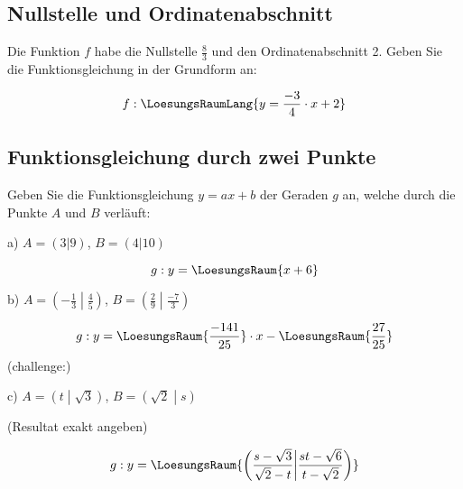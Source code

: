 \subsection{Nullstelle und Ordinatenabschnitt}
Die Funktion $f$ habe die Nullstelle $\frac83$ und den
Ordinatenabschnitt 2. Geben Sie die Funktionsgleichung in der
Grundform an:

\vspace{20mm}
$$f: \LoesungsRaumLang{y = \frac{-3}4 \cdot{} x + 2}$$

\subsection{Funktionsgleichung durch zwei Punkte}
Geben Sie die Funktionsgleichung $y=ax+b$ der Geraden $g$ an, welche
durch die Punkte $A$ und $B$ verläuft:

a) $A = (3|9)$, $B=(4|10)$

\vspace{15mm}

$$g: y= \LoesungsRaum{x + 6}$$
\vspace{5mm}

b) $A = \left(-\frac13\middle|\frac45\right)$, $B=\left(\frac29\middle|\frac{-7}3\right)$

\vspace{15mm}

$$g: y= \LoesungsRaum{ \frac{-141}{25}} \cdot{} x -  \LoesungsRaum{\frac{27}{25}}$$
\vspace{5mm}
\newpage
(challenge:)

\vspace{3mm}

c) $A = \left( t \middle| \sqrt{3} \right)$,
$B=\left( \sqrt{2} \middle| s \right)$

(Resultat exakt angeben)

\vspace{15mm}

$$g: y= \LoesungsRaum{\left( \frac{s-\sqrt{3}}{\sqrt{2}-t} \middle| \frac{st-\sqrt{6}}{t-\sqrt{2}}\right)}$$
\vspace{5mm}


